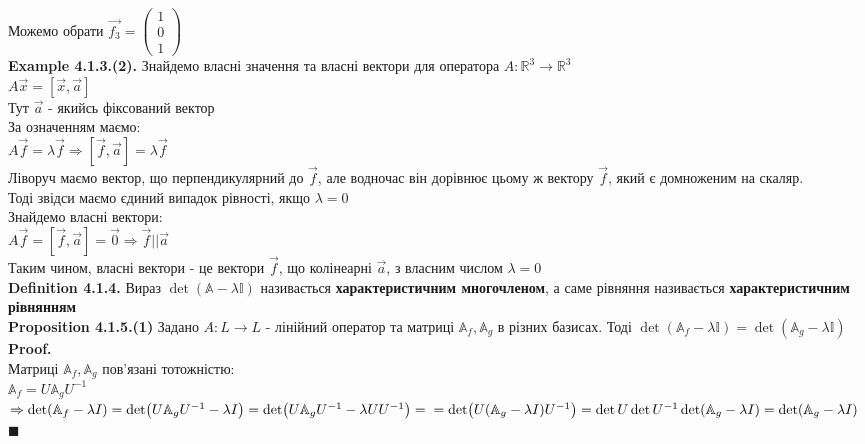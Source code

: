 \documentclass[a4paper, 14pt]{extarticle}
\def\defin#1{\textbf{Definition {#1}}}
\def\ex#1{\textbf{Example {#1}}}
\def\prp#1{\textbf{Proposition {#1}}}
\def\proof{\textbf{Proof.}\\}
\def\bigline{\vspace{5mm}\\}
\def\qed{$\blacksquare$}
\begin{document}
Можемо обрати $\vec{f_3} = \begin{pmatrix}
1 \\ 0 \\ 1
\end{pmatrix}$
\bigline
\ex{4.1.3.(2).} Знайдемо власні значення та власні вектори для оператора $A: \mathbb{R}^3 \to \mathbb{R}^3$\\
$A\vec{x} = [\vec{x}, \vec{a}]$\\
Тут $\vec{a}$ - якийсь фіксований вектор\\
За означенням маємо:\\
$A\vec{f} = \lambda \vec{f} \Rightarrow [\vec{f},\vec{a}] = \lambda \vec{f}$\\
Ліворуч маємо вектор, що перпендикулярний до $\vec{f}$, але водночас він дорівнює цьому ж вектору $\vec{f}$, який є домноженим на скаляр.\\
Тоді звідси маємо єдиний випадок рівності, якщо $\lambda = 0$\\
Знайдемо власні вектори:\\
$A\vec{f} = [\vec{f}, \vec{a}] = \vec{0} \Rightarrow \vec{f} || \vec{a}$\\
Таким чином, власні вектори - це вектори $\vec{f}$, що колінеарні $\vec{a}$, з власним числом $\lambda = 0$
\bigline
\defin{4.1.4.} Вираз $\det(\mathbb{A} - \lambda \mathbb{I})$ називається \textbf{характеристичним многочленом}, а саме рівняння називається \textbf{характеристичним рівнянням}
\bigline
\prp{4.1.5.(1)} Задано $A: L \to L$ - лінійний оператор та матриці $\mathbb{A}_f, \mathbb{A}_g$ в різних базисах. Тоді $\det(\mathbb{A}_f - \lambda \mathbb{I}) = \det(\mathbb{A}_g - \lambda \mathbb{I})$\\
\proof
Матриці $\mathbb{A}_f, \mathbb{A}_g$ пов'язані тотожністю:\\
$\mathbb{A}_f = U \mathbb{A}_g U^{-1}$\\
$\Rightarrow \det(\mathbb{A}_f - \lambda I) = \det(U \mathbb{A}_g U^{-1} - \lambda I) = \det(U \mathbb{A}_g U^{-1} - \lambda U U^{-1}) = \\ = \det(U(\mathbb{A}_g-\lambda I)U^{-1}) = \det U \det U^{-1} \det (\mathbb{A}_g - \lambda I) = \det (\mathbb{A}_g - \lambda I)$ \qed
\bigline
\end{document}
